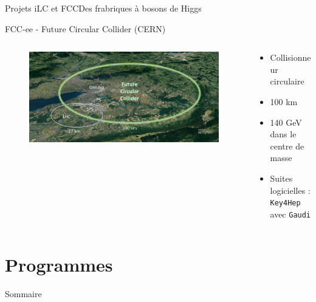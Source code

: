 \documentclass[9pt]{beamer}
\begin{document}
\begin{frame}{Projets iLC et FCC}{Des frabriques à bosons de Higgs}
\begin{block}{FCC-ee - Future Circular Collider (CERN)}
\begin{columns}
            \begin{column}{0.45\textwidth}
                \begin{figure}
                    \includegraphics[width=\textwidth]{../img/FCC.jpg}
                \end{figure}
            \end{column}
            
            \begin{column}{0.45\textwidth}
                \begin{itemize}
                    \item Collisionneur circulaire
                    \item 100 km
                    \item 140 GeV dans le centre de masse
                    \item Suites logicielles : \texttt{Key4Hep} avec \texttt{Gaudi} 
                \end{itemize}
            \end{column}
            
        \end{columns}
    \end{block}
    
\end{frame}


\section{Programmes}

\begin{frame}{Sommaire}
	\begin{columns}[onlytextwidth,T]
        \begin{column}{.45\textwidth}
            \tableofcontents[currentsection, sections=1-2]
        \end{column}
        \begin{column}{.45\textwidth}
            \tableofcontents[currentsection, sections=3-5]
        \end{column}
    \end{columns}
\end{frame}
\end{document}
